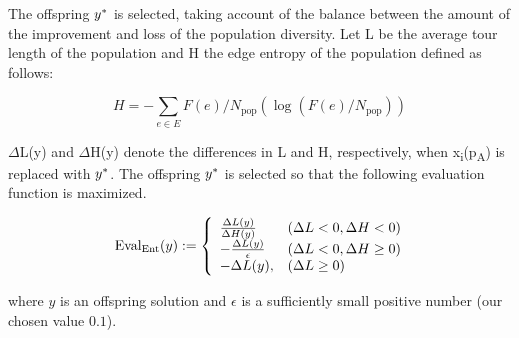 The offspring $y\ssymbol{1}$ is selected, taking account of the balance between the amount of the improvement and loss of the population diversity. Let L be the average tour length of the population and H the edge entropy of the population defined as follows:

\begin{equation}
H=-\sum_{e \in E} F(e) / N_{\mathrm{pop}}\left(\log \left(F(e) / N_{\mathrm{pop}}\right)\right)
\end{equation}

$\Delta$L(y) and $\Delta$H(y) denote the differences in L and H, respectively, when x\textsubscript{i}(p\textsubscript{A}) is replaced with $y\ssymbol{1}$. The offspring $y\ssymbol{1}$ is selected so that the following evaluation function is maximized.

\begin{equation}\text { Eval\textsubscript{Ent}}(y):=\left\{\begin{array}{ll}
\frac{\Delta L(y)}{\Delta H(y)} & (\Delta L<0, \Delta H<0) \\
-\frac{\Delta L(y)}{\epsilon} & (\Delta L<0, \Delta H \geq 0) \\
-\Delta L(y), & (\Delta L \geq 0)
\end{array}\right.\end{equation}

where $y$ is an offspring solution and $\epsilon$ is a sufficiently small positive number (our chosen value $0.1$).\\
